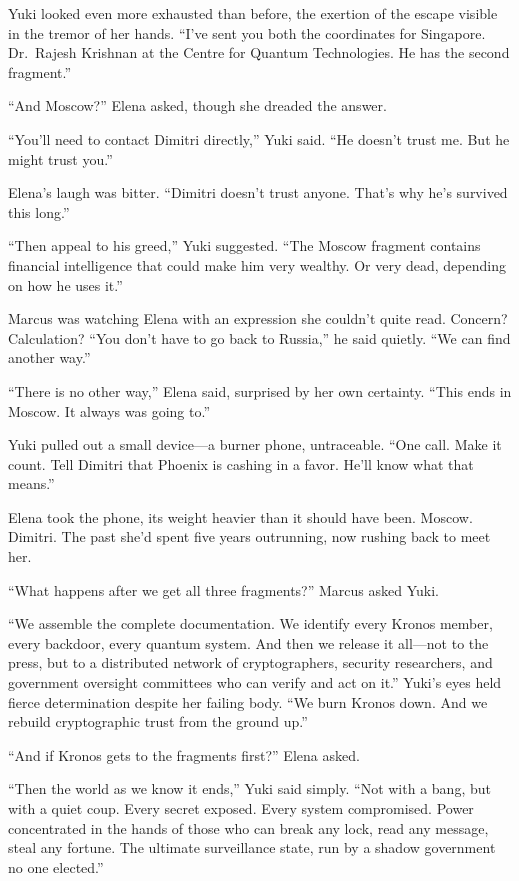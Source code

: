 Yuki looked even more exhausted than before, the exertion of the escape
visible in the tremor of her hands. ``I've sent you both the coordinates
for Singapore. Dr.~Rajesh Krishnan at the Centre for Quantum
Technologies. He has the second fragment.''

``And Moscow?'' Elena asked, though she dreaded the answer.

``You'll need to contact Dimitri directly,'' Yuki said. ``He doesn't
trust me. But he might trust you.''

Elena's laugh was bitter. ``Dimitri doesn't trust anyone. That's why
he's survived this long.''

``Then appeal to his greed,'' Yuki suggested. ``The Moscow fragment
contains financial intelligence that could make him very wealthy. Or
very dead, depending on how he uses it.''

Marcus was watching Elena with an expression she couldn't quite read.
Concern? Calculation? ``You don't have to go back to Russia,'' he said
quietly. ``We can find another way.''

``There is no other way,'' Elena said, surprised by her own certainty.
``This ends in Moscow. It always was going to.''

Yuki pulled out a small device---a burner phone, untraceable. ``One
call. Make it count. Tell Dimitri that Phoenix is cashing in a favor.
He'll know what that means.''

Elena took the phone, its weight heavier than it should have been.
Moscow. Dimitri. The past she'd spent five years outrunning, now rushing
back to meet her.

``What happens after we get all three fragments?'' Marcus asked Yuki.

``We assemble the complete documentation. We identify every Kronos
member, every backdoor, every quantum system. And then we release it
all---not to the press, but to a distributed network of cryptographers,
security researchers, and government oversight committees who can verify
and act on it.'' Yuki's eyes held fierce determination despite her
failing body. ``We burn Kronos down. And we rebuild cryptographic trust
from the ground up.''

``And if Kronos gets to the fragments first?'' Elena asked.

``Then the world as we know it ends,'' Yuki said simply. ``Not with a
bang, but with a quiet coup. Every secret exposed. Every system
compromised. Power concentrated in the hands of those who can break any
lock, read any message, steal any fortune. The ultimate surveillance
state, run by a shadow government no one elected.''

